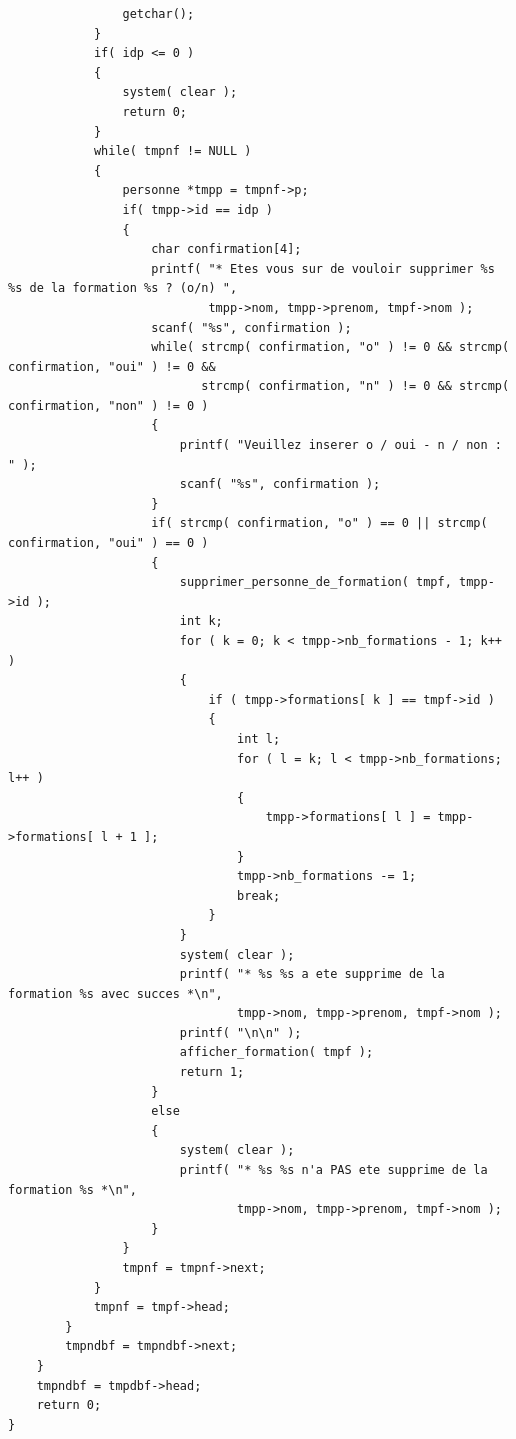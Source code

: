 \documentclass[11pt]{article}
\begin{document}
\begin{lstlisting}
                getchar();
            }
            if( idp <= 0 )
            {
                system( clear );
                return 0;
            }
            while( tmpnf != NULL )
            {
                personne *tmpp = tmpnf->p;
                if( tmpp->id == idp )
                {
                    char confirmation[4];
                    printf( "* Etes vous sur de vouloir supprimer %s %s de la formation %s ? (o/n) ",
                            tmpp->nom, tmpp->prenom, tmpf->nom );
                    scanf( "%s", confirmation );
                    while( strcmp( confirmation, "o" ) != 0 && strcmp( confirmation, "oui" ) != 0 &&
                           strcmp( confirmation, "n" ) != 0 && strcmp( confirmation, "non" ) != 0 )
                    {
                        printf( "Veuillez inserer o / oui - n / non : " );
                        scanf( "%s", confirmation );
                    }
                    if( strcmp( confirmation, "o" ) == 0 || strcmp( confirmation, "oui" ) == 0 )
                    {
                        supprimer_personne_de_formation( tmpf, tmpp->id );
                        int k;
                        for ( k = 0; k < tmpp->nb_formations - 1; k++ )
                        {
                            if ( tmpp->formations[ k ] == tmpf->id )
                            {
                                int l;
                                for ( l = k; l < tmpp->nb_formations; l++ )
                                {
                                    tmpp->formations[ l ] = tmpp->formations[ l + 1 ];
                                }
                                tmpp->nb_formations -= 1;
                                break;
                            }
                        }
                        system( clear );
                        printf( "* %s %s a ete supprime de la formation %s avec succes *\n",
                                tmpp->nom, tmpp->prenom, tmpf->nom );
                        printf( "\n\n" );
                        afficher_formation( tmpf );
                        return 1;
                    }
                    else
                    {
                        system( clear );
                        printf( "* %s %s n'a PAS ete supprime de la formation %s *\n",
                                tmpp->nom, tmpp->prenom, tmpf->nom );
                    }
                }
                tmpnf = tmpnf->next;
            }
            tmpnf = tmpf->head;
        }
        tmpndbf = tmpndbf->next;
    }
    tmpndbf = tmpdbf->head;
    return 0;
}


\end{lstlisting}
\end{document}
